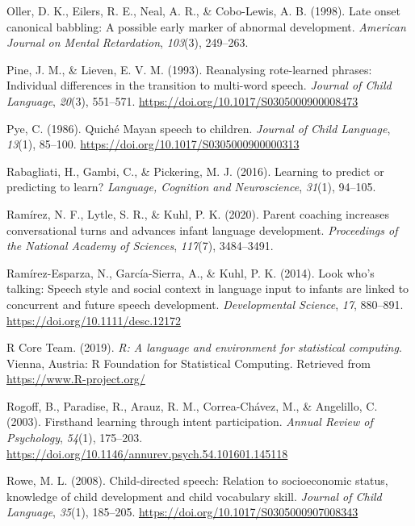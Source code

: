 \documentclass[
  english,
  ,man,floatsintext]{apa6}
\begin{document}
\leavevmode\hypertarget{ref-oller1998late}{}%
Oller, D. K., Eilers, R. E., Neal, A. R., \& Cobo-Lewis, A. B. (1998). Late onset canonical babbling: A possible early marker of abnormal development. \emph{American Journal on Mental Retardation}, \emph{103}(3), 249--263.

\leavevmode\hypertarget{ref-pine1993reanalysing}{}%
Pine, J. M., \& Lieven, E. V. M. (1993). Reanalysing rote-learned phrases: Individual differences in the transition to multi-word speech. \emph{Journal of Child Language}, \emph{20}(3), 551--571. \url{https://doi.org/10.1017/S0305000900008473}

\leavevmode\hypertarget{ref-pye1986quiche}{}%
Pye, C. (1986). Quiché Mayan speech to children. \emph{Journal of Child Language}, \emph{13}(1), 85--100. \url{https://doi.org/10.1017/S0305000900000313}

\leavevmode\hypertarget{ref-rabagliati2016learning}{}%
Rabagliati, H., Gambi, C., \& Pickering, M. J. (2016). Learning to predict or predicting to learn? \emph{Language, Cognition and Neuroscience}, \emph{31}(1), 94--105.

\leavevmode\hypertarget{ref-ramirez2020parent}{}%
Ramírez, N. F., Lytle, S. R., \& Kuhl, P. K. (2020). Parent coaching increases conversational turns and advances infant language development. \emph{Proceedings of the National Academy of Sciences}, \emph{117}(7), 3484--3491.

\leavevmode\hypertarget{ref-ramirezesparza2014look}{}%
Ramírez-Esparza, N., García-Sierra, A., \& Kuhl, P. K. (2014). Look who's talking: Speech style and social context in language input to infants are linked to concurrent and future speech development. \emph{Developmental Science}, \emph{17}, 880--891. \url{https://doi.org/10.1111/desc.12172}

\leavevmode\hypertarget{ref-R-base}{}%
R Core Team. (2019). \emph{R: A language and environment for statistical computing}. Vienna, Austria: R Foundation for Statistical Computing. Retrieved from \url{https://www.R-project.org/}

\leavevmode\hypertarget{ref-rogoff2003firsthand}{}%
Rogoff, B., Paradise, R., Arauz, R. M., Correa-Chávez, M., \& Angelillo, C. (2003). Firsthand learning through intent participation. \emph{Annual Review of Psychology}, \emph{54}(1), 175--203. \url{https://doi.org/10.1146/annurev.psych.54.101601.145118}

\leavevmode\hypertarget{ref-rowe2008child}{}%
Rowe, M. L. (2008). Child-directed speech: Relation to socioeconomic status, knowledge of child development and child vocabulary skill. \emph{Journal of Child Language}, \emph{35}(1), 185--205. \url{https://doi.org/10.1017/S0305000907008343}
\end{document}
